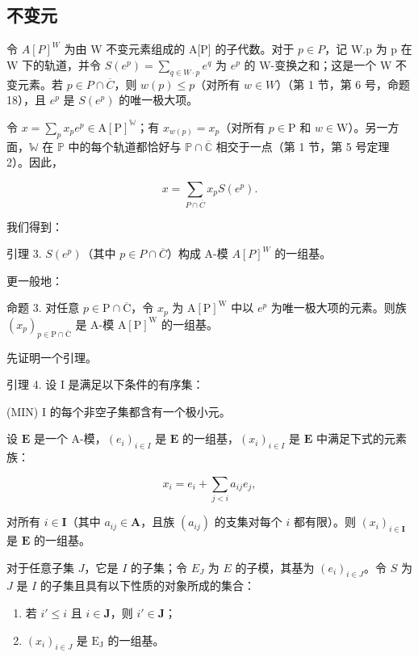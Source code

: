 \subsection{不变元}

令 \(A[P]^W\) 为由 W 不变元素组成的 A{[}P{]} 的子代数。对于 \(p \in P\)，记 W.p 为 p 在 W 下的轨道，并令 \(S(e^p) = \sum_{q \in W \cdot p} e^q\) 为 \(e^p\) 的 W-变换之和；这是一个 W 不变元素。若 \(p \in P \cap \overline{C}\)，则 \(w(p) \leqslant p\)（对所有 \(w \in W\)）（第 1 节，第 6 号，命题 18），且 \(e^p\) 是 \(S(e^p)\) 的唯一极大项。

令 \(x = \sum_{p} x_{p} e^{p} \in \mathrm{A}[\mathrm{P}]^{\mathbb{W}}\)；有 \(x_{w(p)} = x_{p}\)（对所有 \(p \in \mathrm{P}\) 和 \(w \in \mathrm{W}\)）。另一方面，\(\mathbb{W}\) 在 \(\mathbb{P}\) 中的每个轨道都恰好与 \(\mathbb{P} \cap \overline{\mathbb{C}}\) 相交于一点（第 1 节，第 5 号定理 2）。因此，

\[
x = \sum_ {P \cap \overline {{C}}} x _ {p} S (e ^ {p}).\tag{6}
\]

我们得到：

引理 3. \(S(e^p)\)（其中 \(p \in P \cap \overline{C}\)）构成 A-模 \(A[P]^W\) 的一组基。

更一般地：

命题 3. 对任意 \(p \in \mathrm{P} \cap \overline{\mathrm{C}}\)，令 \(x_p\) 为 \(\mathrm{A}[\mathrm{P}]^{\mathrm{W}}\) 中以 \(e^p\) 为唯一极大项的元素。则族 \((x_p)_{p \in \mathrm{P} \cap \overline{\mathrm{C}}}\) 是 A-模 \(\mathrm{A}[\mathrm{P}]^{\mathrm{W}}\) 的一组基。

先证明一个引理。

引理 4. 设 I 是满足以下条件的有序集：

(MIN) I 的每个非空子集都含有一个极小元。

设 \(\mathbf{E}\) 是一个 A-模，\((e_i)_{i \in I}\) 是 \(\mathbf{E}\) 的一组基，\((x_i)_{i \in I}\) 是 \(\mathbf{E}\) 中满足下式的元素族：

\[
x _ {i} = e _ {i} + \sum_ {j <   i} a _ {i j} e _ {j},
\]

对所有 \(i \in \mathbf{I}\)（其中 \(a_{ij} \in \mathbf{A}\)，且族 \((a_{ij})\) 的支集对每个 \(i\) 都有限）。则 \((x_i)_{i \in \mathbf{I}}\) 是 \(\mathbf{E}\) 的一组基。

对于任意子集 \(J\)，它是 \(I\) 的子集；令 \(E_J\) 为 \(E\) 的子模，其基为 \((e_i)_{i \in J}\)。令 \(S\) 为 \(J\) 是 \(I\) 的子集且具有以下性质的对象所成的集合：

\begin{enumerate}
\def\labelenumi{(\alph{enumi})}
\item
  若 \(i' \leqslant i\) 且 \(i \in \mathbf{J}\)，则 \(i' \in \mathbf{J}\)；
\item
  \((x_{i})_{i\in J}\) 是 \(\mathrm{E_J}\) 的一组基。
\end{enumerate}

